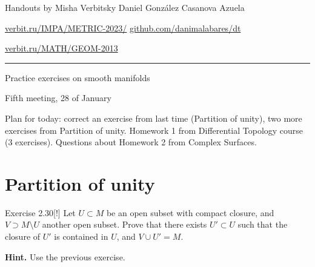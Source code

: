 \usepackage{multicol}
%



\begin{minipage}{\textwidth}
	\begin{minipage}{1\textwidth}
	Handouts by Misha Verbitsky	 \hfill Daniel González Casanova Azuela
		
		{\small \href{http://verbit.ru/IMPA/METRIC-2023/}{verbit.ru/IMPA/METRIC-2023/} \hfill\href{https://github.com/danimalabares/dt}{github.com/danimalabares/dt}

		 \href{http://verbit.ru/MATH/GEOM-2013/}{verbit.ru/MATH/GEOM-2013}}
	\end{minipage}
\end{minipage}\vspace{.2cm}\hrule

\vspace{10pt}
{\huge Practice exercises on smooth manifolds}

{\large Fifth meeting, 28 of January}
\vspace{1em}

Plan for today: correct an exercise from last time (Partition of unity), two more exercises from Partition of unity. Homework 1 from Differential Topology course (3 exercises). Questions about Homework 2 from Complex Surfaces.

\iffalse\begin{itemize}
\item Topological spaces (1)
\item Hausdorff spaces (1)
\item Compact spaces (1)
\item Smooth manifolds (4)
\item Embedded submanifolds (2)
\item Partition of unity (2)
\end{itemize}\fi

\section{Partition of unity}

\begin{thing4}{Exercise 2.30}[!]\label{exer:2.30}\leavevmode
Let \(U \subset M\) be an open subset with compact closure, and \(V \supset M\setminus U\) another open subset. Prove that there exists \(U' \subset U\) such that the closure of \(U'\) is contained in \(U\), and \(V \cup  U'=M\).

\textbf{Hint.} Use the previous exercise.
\end{thing4}


